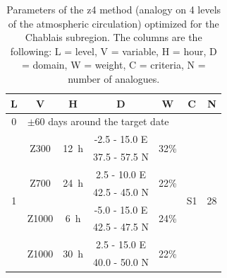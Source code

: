 \documentclass[5p]{elsarticle}
\begin{document}
\begin{table}[htbp]
	\caption{Parameters of the z4 method (analogy on 4 levels of the atmospheric circulation) optimized for the Chablais subregion. The columns are the following: L = level, V = variable, H = hour, D = domain, W = weight, C = criteria, N = number of analogues.}
	\footnotesize
	\begin{center}
		\begin{tabular}{ccccccc}
			\hline L & V & H & D & W & C & N \\ 
			\hline 
			0 & \multicolumn{6}{l}{$\pm 60$ days around the target date} \\
			\hline 
			\multirow{8}{*}{1} &  \multirow{2}{*}{Z300} & \multirow{2}{*}{12~h} & -2.5 - 15.0 \degree E & \multirow{2}{*}{32\%} & \multirow{8}{*}{S1} & \multirow{8}{*}{28} \\
			& & & 37.5 - 57.5 \degree N & & & \\ 
			& \multirow{2}{*}{Z700} & \multirow{2}{*}{24~h} & 2.5 - 10.0 \degree E & \multirow{2}{*}{22\%} & & \\ 
			& & & 42.5 - 45.0 \degree N & & & \\ 
			& \multirow{2}{*}{Z1000} & \multirow{2}{*}{6~h} & -5.0 - 15.0 \degree E & \multirow{2}{*}{24\%} & & \\ 
			& & & 42.5 - 47.5 \degree N & & & \\ 
			& \multirow{2}{*}{Z1000} & \multirow{2}{*}{30~h} & 2.5 - 15.0 \degree E & \multirow{2}{*}{22\%} & & \\ 
			& & & 40.0 - 50.0 \degree N & & & \\ 
			\hline 
		\end{tabular} 
	\end{center}
	\label{table:params_GA_z4}
\end{table}
\end{document}
